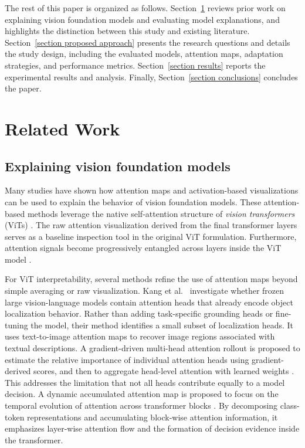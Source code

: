 \documentclass[lineno,pdflatex,sn-mathphys-num]{sn-jnl}%
\theoremstyle{thmstyleone}%
\theoremstyle{thmstyletwo}%
\theoremstyle{thmstylethree}%
\begin{document}
The rest of this paper is organized as follows. Section~\ref{section related works} reviews prior work on explaining vision foundation models and evaluating model explanations, and highlights the distinction between this study and existing literature. Section~\ref{section proposed approach} presents the research questions and details the study design, including the evaluated models, attention maps, adaptation strategies, and performance metrics. Section~\ref{section results} reports the experimental results and analysis. Finally, Section~\ref{section conclusions} concludes the paper.

\section{Related Work} \label{section related works}

\subsection{Explaining vision foundation models}

Many studies have shown how attention maps and activation-based visualizations can be used to explain the behavior of vision foundation models. These attention-based methods leverage the native self-attention structure of \textit{vision transformers} (ViTs) \cite{dosovitskiy21vit}. The raw attention visualization derived from the final transformer layers serves as a baseline inspection tool in the original ViT formulation. Furthermore, attention signals become progressively entangled across layers inside the ViT model \cite{Abnar20Rollout}.

For ViT interpretability, several methods refine the use of attention maps beyond simple averaging or raw visualization. Kang et al.~\cite{Kang20259339} investigate whether frozen large vision-language models contain attention heads that already encode object localization behavior. Rather than adding task-specific grounding heads or fine-tuning the model, their method identifies a small subset of localization heads. It uses text-to-image attention maps to recover image regions associated with textual descriptions. A gradient-driven multi-head attention rollout is proposed to estimate the relative importance of individual attention heads using gradient-derived scores, and then to aggregate head-level attention with learned weights \cite{Jo2025582}. This addresses the limitation that not all heads contribute equally to a model decision. A dynamic accumulated attention map is proposed to focus on the temporal evolution of attention across transformer blocks \cite{Liao2025PR}. By decomposing class-token representations and accumulating block-wise attention information, it emphasizes layer-wise attention flow and the formation of decision evidence inside the transformer.
\end{document}

